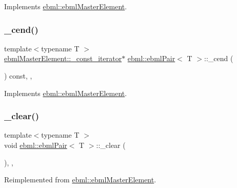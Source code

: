 Implements \mbox{\hyperlink{classebml_1_1ebmlMasterElement_a7e1ffa498e22b637a6671df14aa0bc45}{ebml\+::ebml\+Master\+Element}}.

\mbox{\label{classebml_1_1ebmlPair_a555af18316fef979695572e2d0f9a784}} 
\subsubsection{\texorpdfstring{\+\_\+cend()}{\_cend()}}
{\footnotesize\ttfamily template$<$typename T $>$ \\
\mbox{\hyperlink{classebml_1_1ebmlMasterElement_1_1__const__iterator}{ebml\+Master\+Element\+::\+\_\+const\+\_\+iterator}}$\ast$ \mbox{\hyperlink{classebml_1_1ebmlPair}{ebml\+::ebml\+Pair}}$<$ T $>$\+::\+\_\+cend (\begin{DoxyParamCaption}{ }\end{DoxyParamCaption}) const\hspace{0.3cm}{\ttfamily [override]}, {\ttfamily [protected]}, {\ttfamily [virtual]}}



Implements \mbox{\hyperlink{classebml_1_1ebmlMasterElement_ae6cdbf68d8267a7ab098bd402fa70e88}{ebml\+::ebml\+Master\+Element}}.

\mbox{\label{classebml_1_1ebmlPair_a521c8592475793acf050353ddf56031c}} 
\subsubsection{\texorpdfstring{\+\_\+clear()}{\_clear()}}
{\footnotesize\ttfamily template$<$typename T $>$ \\
void \mbox{\hyperlink{classebml_1_1ebmlPair}{ebml\+::ebml\+Pair}}$<$ T $>$\+::\+\_\+clear (\begin{DoxyParamCaption}{ }\end{DoxyParamCaption})\hspace{0.3cm}{\ttfamily [override]}, {\ttfamily [protected]}, {\ttfamily [virtual]}}



Reimplemented from \mbox{\hyperlink{classebml_1_1ebmlMasterElement_a2fdf9fa1022f06a046fe94e631e266a3}{ebml\+::ebml\+Master\+Element}}.

